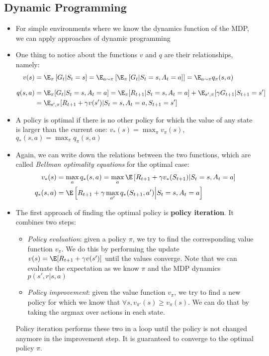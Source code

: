 \subsection{Dynamic Programming}
\begin{itemize}
	\item For simple environments where we know the dynamics function of the MDP, we can apply approaches of dynamic programming
	\item One thing to notice about the functions $v$ and $q$ are their relationships, namely:
	\begin{equation*}
		\begin{split}
			v(s) & = \E_{\pi}\left[G_t|S_t=s\right] = \E_{a\sim\pi}\left[\E_{\pi}\left[G_t|S_t=s,A_t=a\right]\right] = \E_{a\sim\pi} q_{\pi}(s,a)\\[8pt]
			q(s,a) & = \E_{\pi}[G_t|S_t=s,A_t=a] = \E_{\pi}[R_{t+1}|S_t=s,A_t=a]+\E_{s',\pi}[\gamma G_{t+1}|S_{t+1}=s'] \\& = \E_{s',\pi}[R_{t+1}+\gamma v(s')|S_t=s,A_t=a,S_{t+1}=s']
		\end{split}
	\end{equation*}
	\item A policy is optimal if there is no other policy for which the value of any state is larger than the current one: $v_{*}(s)=\max_{\pi} v_{\pi}(s)$, $q_{*}(s,a)=\max_{\pi} q_{\pi}(s,a)$
	\item Again, we can write down the relations between the two functions, which are called \textit{Bellman optimality equations} for the optimal case:
	\begin{equation*}
		\begin{split}
			v_{*}(s) & =\max_{a}q_{*}(s,a)= \max_a \E\left[R_{t+1}+\gamma v_{*}(S_{t+1})|S_t=s,A_t=a\right]\\
			q_{*}(s,a) & = \E\left[R_{t+1}+\gamma \max_{a'} q_{*}(S_{t+1},a')\Big\vert S_t=s,A_t=a\right]
		\end{split}
	\end{equation*}
	
	\item The first approach of finding the optimal policy is \textbf{policy iteration}. It combines two steps:
	\begin{itemize}
		\item \textit{Policy evaluation}: given a policy $\pi$, we try to find the corresponding value function $v_{\pi}$. We do this by performing the update $v(s)=\E[R_{t+1}+\gamma v(s')]$ until the values converge. Note that we can evaluate the expectation as we know $\pi$ and the MDP dynamics $p(s',r|s,a)$
		\item \textit{Policy improvement}: given the value function $v_{\pi}$, we try to find a new policy for which we know that $\forall s, v_{\pi'}(s)\geq v_{\pi}(s)$. We can do that by taking the argmax over actions in each state.
	\end{itemize}
	Policy iteration performs these two in a loop until the policy is not changed anymore in the improvement step. It is guaranteed to converge to the optimal policy $\pi$.
	

\end{itemize}
